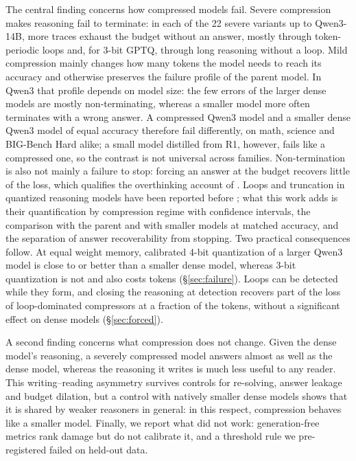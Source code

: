 \documentclass[10pt]{article}
\begin{document}
The central finding concerns how compressed models fail. Severe compression makes reasoning fail to terminate: in each of the 22 severe variants up to Qwen3-14B, more traces exhaust the budget without an answer, mostly through token-periodic loops and, for 3-bit GPTQ, through long reasoning without a loop. Mild compression mainly changes how many tokens the model needs to reach its accuracy and otherwise preserves the failure profile of the parent model. In Qwen3 that profile depends on model size: the few errors of the larger dense models are mostly non-terminating, whereas a smaller model more often terminates with a wrong answer. A compressed Qwen3 model and a smaller dense Qwen3 model of equal accuracy therefore fail differently, on math, science and BIG-Bench Hard alike; a small model distilled from R1, however, fails like a compressed one, so the contrast is not universal across families. Non-termination is also not mainly a failure to stop: forcing an answer at the budget recovers little of the loss, which qualifies the overthinking account of \citet{lotfi2026quantized}. Loops and truncation in quantized reasoning models have been reported before \citep{chen2026onpolicy,zheng2026rightonq}; what this work adds is their quantification by compression regime with confidence intervals, the comparison with the parent and with smaller models at matched accuracy, and the separation of answer recoverability from stopping. Two practical consequences follow. At equal weight memory, calibrated 4-bit quantization of a larger Qwen3 model is close to or better than a smaller dense model, whereas 3-bit quantization is not and also costs tokens (\S\ref{sec:failure}). Loops can be detected while they form, and closing the reasoning at detection recovers part of the loss of loop-dominated compressors at a fraction of the tokens, without a significant effect on dense models (\S\ref{sec:forced}).

A second finding concerns what compression does not change. Given the dense model's reasoning, a severely compressed model answers almost as well as the dense model, whereas the reasoning it writes is much less useful to any reader. This writing--reading asymmetry survives controls for re-solving, answer leakage and budget dilation, but a control with natively smaller dense models shows that it is shared by weaker reasoners in general: in this respect, compression behaves like a smaller model. Finally, we report what did not work: generation-free metrics rank damage but do not calibrate it, and a threshold rule we pre-registered failed on held-out data.
\end{document}
